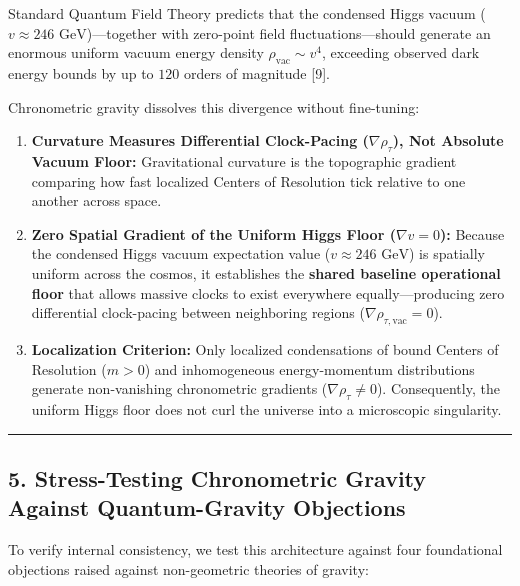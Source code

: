 \documentclass[
]{article}
\providecommand{\tightlist}{%
  \setlength{\itemsep}{0pt}\setlength{\parskip}{0pt}}
\begin{document}
Standard Quantum Field Theory predicts that the condensed Higgs vacuum
(\(v \approx 246\text{ GeV}\))---together with zero-point field
fluctuations---should generate an enormous uniform vacuum energy density
\(\rho_{\mathrm{vac}} \sim v^4\), exceeding observed dark energy bounds
by up to \(120\) orders of magnitude {[}9{]}.

Chronometric gravity dissolves this divergence without fine-tuning:

\begin{enumerate}
\def\labelenumi{\arabic{enumi}.}
\tightlist
\item
  \textbf{Curvature Measures Differential Clock-Pacing
  (\(\nabla\rho_\tau\)), Not Absolute Vacuum Floor:} Gravitational
  curvature is the topographic gradient comparing how fast localized
  Centers of Resolution tick relative to one another across space.
\item
  \textbf{Zero Spatial Gradient of the Uniform Higgs Floor
  (\(\nabla v = 0\)):} Because the condensed Higgs vacuum expectation
  value (\(v \approx 246\text{ GeV}\)) is spatially uniform across the
  cosmos, it establishes the \textbf{shared baseline operational floor}
  that allows massive clocks to exist everywhere equally---producing
  zero differential clock-pacing between neighboring regions
  (\(\nabla\rho_{\tau,\mathrm{vac}} = 0\)).
\item
  \textbf{Localization Criterion:} Only localized condensations of bound
  Centers of Resolution (\(m > 0\)) and inhomogeneous energy-momentum
  distributions generate non-vanishing chronometric gradients
  (\(\nabla\rho_\tau \neq 0\)). Consequently, the uniform Higgs floor
  does not curl the universe into a microscopic singularity.
\end{enumerate}

\begin{center}\rule{0.5\linewidth}{0.5pt}\end{center}

\subsection{5. Stress-Testing Chronometric Gravity Against
Quantum-Gravity
Objections}\label{stress-testing-chronometric-gravity-against-quantum-gravity-objections}

To verify internal consistency, we test this architecture against four
foundational objections raised against non-geometric theories of
gravity:
\end{document}
